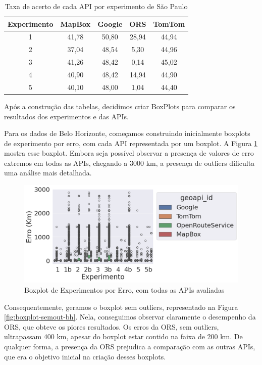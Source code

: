 \begin{table}[!ht]
  \centering
  \caption{Taxa de acerto de cada API por experimento de São Paulo}
  \label{tab:txAcerExpAPISP}
  \begin{adjustbox}{width=0.7\textwidth}
  \begin{tabular}{|c|c|c|c|c|}
  \hline
  Experimento & MapBox & Google & ORS & TomTom\\
  \hline
  1 & 41,78 & 50,80 & 28,94 & 44,94\\
  \hline
  2 & 37,04 & 48,54 & 5,30 & 44,96\\
  \hline
  3 & 41,26 & 48,42 & 0,14 & 45,02\\
  \hline
  4 & 40,90 & 48,42 & 14,94 & 44,90\\
  \hline
  5 & 40,10 & 48,00 & 1,04 & 44,40\\
  \hline
  \end{tabular}
  \end{adjustbox}
\end{table}

Após a construção das tabelas, decidimos criar BoxPlots para comparar os resultados dos experimentos e das APIs.

Para os dados de Belo Horizonte, começamos construindo inicialmente boxplots de experimento por erro, com cada API representada por um boxplot. A Figura \ref{fig:boxplot-completo-bh} mostra esse boxplot. Embora seja possível observar a presença de valores de erro extremos em todas as APIs, chegando a 3000 km, a presença de outliers dificulta uma análise mais detalhada.

\begin{figure}[h]
    \centering
    \includegraphics[width=\textwidth]{Figuras/boxplotExperimento.png}
    \caption{Boxplot de Experimentos por Erro, com todas as APIs avaliadas}
    \label{fig:boxplot-completo-bh}
\end{figure}

Consequentemente, geramos o boxplot sem outliers, representado na Figura \ref{fig:boxplot-semout-bh}. Nela, conseguimos observar claramente o desempenho da ORS, que obteve os piores resultados. Os erros da ORS, sem outliers, ultrapassam 400 km, apesar do boxplot estar contido na faixa de 200 km. De qualquer forma, a presença da ORS prejudica a comparação com as outras APIs, que era o objetivo inicial na criação desses boxplots.


